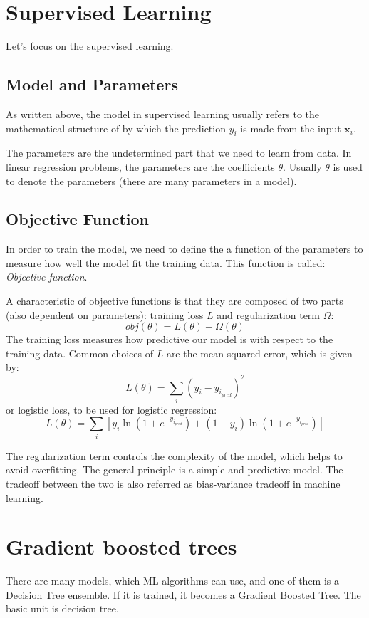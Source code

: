 \documentclass[a4paper, oneside]{book}
\begin{document}
		\section{Supervised Learning}
		Let's focus on the supervised learning. \cite{GBT}
			\subsection{Model and Parameters}
			As written above, the model in supervised learning usually refers to the mathematical structure of by which the prediction $y_i$ is made from the input $\textbf{x}_i$.
		
			The parameters are the undetermined part that we need to learn from data. In linear regression problems, the parameters are the coefficients $\theta$. Usually $\theta$ is used to denote the parameters (there are many parameters in a model).
		
			\subsection{Objective Function}
			In order to train the model, we need to define the a function of the parameters to measure how well the model fit the training data. This function is called: \textit{Objective function}.
			
			A characteristic of objective functions is that they are composed of two parts (also dependent on parameters): training loss $L$ and regularization term $\Omega$:
			$$
			obj(\theta) = L(\theta) + \Omega(\theta)
			$$
			The training loss measures how predictive our model is with respect to the training data. Common choices of $L$ are the mean squared error, which is given by:
			$$
			L(\theta) = \sum_{i}(y_i - y_{i_{pred}})^2
			$$
			or logistic loss, to be used for logistic regression:
			$$
			L(\theta) = \sum_{i}  [{ y_i\ln(1+e^{-y_{i_{pred}}}) + (1-y_i) \ln(1+e^{-y_{i_{pred}}})    }]
			$$
			
			The regularization term controls the complexity of the model, which helps to avoid overfitting. The general principle is a simple and predictive model. The tradeoff between the two is also referred as bias-variance tradeoff in machine learning.
		\section{Gradient boosted trees}
		There are many models, which ML algorithms can use, and one of them is a
		Decision Tree ensemble. If it is trained, it becomes a Gradient Boosted Tree. The basic unit is decision tree.
\end{document}
